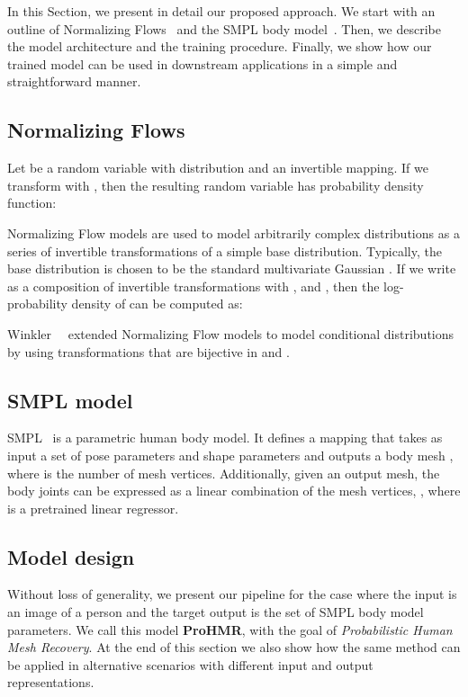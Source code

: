 In this Section, we present in detail our proposed approach. We start with an outline of Normalizing Flows~\cite{rezende15flows} and the SMPL body model~\cite{loper2015smpl}.  Then, we describe the model architecture and the training procedure. Finally, we show how our trained model can be used in downstream applications in a simple and straightforward manner.

\subsection{Normalizing Flows}
Let  be a random variable with distribution   and  an invertible mapping. If we transform  with , then the resulting random variable  has probability density function:


Normalizing Flow models are used to model arbitrarily complex distributions as a series of invertible transformations of a simple base distribution. Typically, the base distribution  is chosen to be the standard multivariate Gaussian . If we write  as a composition of invertible transformations  with ,  and , then the log-probability density of  can be computed as:


Winkler~\etal~\cite{winkler2019learning} extended Normalizing Flow models to model conditional distributions  by using transformations  that are bijective in  and .

\subsection{SMPL model}

SMPL~\cite{loper2015smpl} is a parametric human body model. It defines a mapping  that takes as input a set of pose parameters  and shape parameters  and outputs a body mesh , where  is the number of mesh vertices. Additionally, given an output mesh, the body joints  can be expressed as a linear combination of the mesh vertices, , where  is a pretrained linear regressor.

\subsection{Model design}

Without loss of generality, we present our pipeline for the case where the input is an image of a person and the target output is the set of SMPL body model parameters. We call this model \textbf{ProHMR}, with the goal of \emph{Probabilistic Human Mesh Recovery}. At the end of this section we also show how the same method can be applied in alternative scenarios with different input and output representations.

